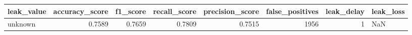 \begin{tabular}{lrrrrrrl}
\toprule
leak\_value & accuracy\_score & f1\_score & recall\_score & precision\_score & false\_positives & leak\_delay & leak\_loss \\
\midrule
unknown & 0.7589 & 0.7659 & 0.7809 & 0.7515 & 1956 & 1 & NaN \\
\bottomrule
\end{tabular}
